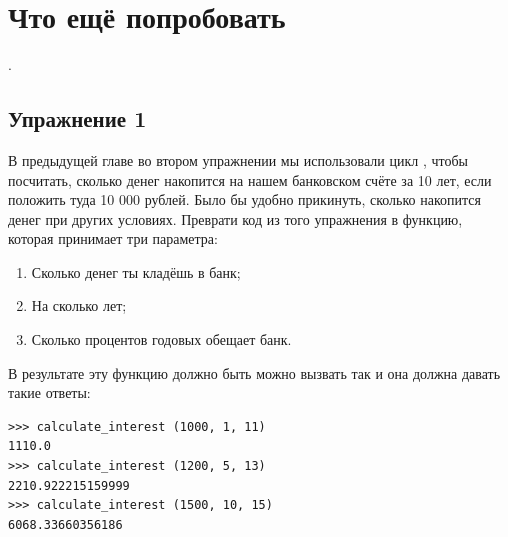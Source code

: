 
\vspace{6pt}

\section{Что ещё попробовать}

.

\subsection*{Упражнение 1}
В предыдущей главе во втором упражнении мы использовали цикл , чтобы посчитать, сколько денег накопится на нашем банковском счёте за 10 лет, если положить туда 10 000 рублей. Было бы удобно прикинуть, сколько накопится денег при других условиях. Преврати код из того упражнения в функцию, которая принимает три параметра:

\begin{enumerate}
\item Сколько денег ты кладёшь в банк;
\item На сколько лет;
\item Сколько процентов годовых обещает банк.
\end{enumerate}

В результате эту функцию должно быть можно вызвать так и она должна давать такие ответы:

\begin{listing}
\begin{verbatim}
>>> calculate_interest (1000, 1, 11)
1110.0
>>> calculate_interest (1200, 5, 13)
2210.922215159999
>>> calculate_interest (1500, 10, 15)
6068.33660356186
\end{verbatim}
\end{listing}

